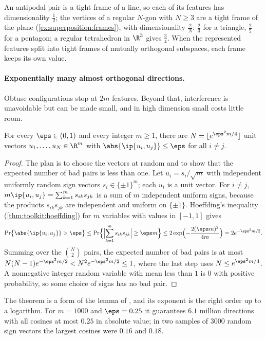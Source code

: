 \begin{refsection}
An antipodal pair is a tight frame of a line, so each of its features has dimensionality $\frac12$; the vertices of a regular $N$-gon with $N\ge3$ are a tight frame of the plane (\cref{ex:superposition:frames}), with dimensionality $\frac2N$: $\frac23$ for a triangle, $\frac25$ for a pentagon; a regular tetrahedron in $\R^3$ gives $\frac34$. When the represented features split into tight frames of mutually orthogonal subspaces, each frame keeps its own value.

\paragraph{Exponentially many almost orthogonal directions.} Obtuse configurations stop at $2m$ features. Beyond that, interference is unavoidable but can be made small, and in high dimension small costs little room.

\begin{theorem}\label{thm:superposition:packing}
For every $\eps\in(0,1)$ and every integer $m\ge1$, there are $N=\lfloor e^{\eps^2m/4}\rfloor$ unit vectors $u_1,\dots,u_N\in\R^m$ with $\abs{\ip{u_i,u_j}}\le\eps$ for all $i\ne j$.
\end{theorem}

\begin{proof}
The plan is to choose the vectors at random and to show that the expected number of bad pairs is less than one. Let $u_i=s_i/\sqrt m$ with independent uniformly random sign vectors $s_i\in\{\pm1\}^m$; each $u_i$ is a unit vector. For $i\ne j$, $m\ip{u_i,u_j}=\sum_{k=1}^ms_{ik}s_{jk}$ is a sum of $m$ independent uniform signs, because the products $s_{ik}s_{jk}$ are independent and uniform on $\{\pm1\}$. Hoeffding's inequality (\cref{thm:toolkit:hoeffding}) for $m$ variables with values in $[-1,1]$ gives
\[
  \Pr\bigl\{\abs{\ip{u_i,u_j}}>\eps\bigr\}\le\Pr\Bigl\{\Bigl\lvert\sum_{k=1}^ms_{ik}s_{jk}\Bigr\rvert\ge\eps m\Bigr\}\le2\exp\Bigl(-\frac{2(\eps m)^2}{4m}\Bigr)=2e^{-\eps^2m/2}.
\]
Summing over the $\binom N2$ pairs, the expected number of bad pairs is at most $N(N-1)e^{-\eps^2m/2}<N^2e^{-\eps^2m/2}\le1$, where the last step uses $N\le e^{\eps^2m/4}$. A nonnegative integer random variable with mean less than $1$ is $0$ with positive probability, so some choice of signs has no bad pair.
\end{proof}

The theorem is a form of the lemma of \textcite{JohnsonLindenstrauss1984}, and its exponent is the right order up to a logarithm. For $m=1000$ and $\eps=0.25$ it guarantees $6.1$ million directions with all cosines at most $0.25$ in absolute value; in two samples of $3000$ random sign vectors the largest cosines were $0.16$ and $0.18$.


\end{refsection}
